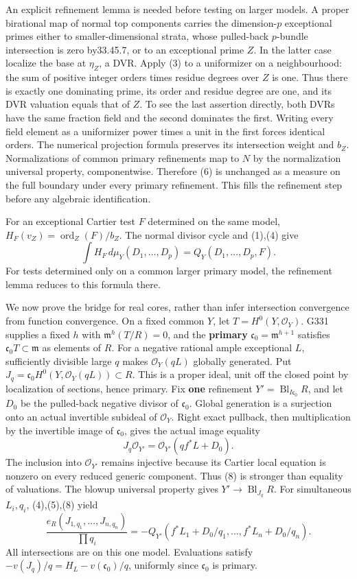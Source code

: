 \documentclass[
  11pt,
]{article}
\begin{document}
An explicit refinement lemma is needed before testing on larger models.
A proper birational map of normal top components carries the
dimension-\(p\) exceptional primes either to smaller-dimensional strata,
whose pulled-back \(p\)-bundle intersection is zero by33.45.7, or to an
exceptional prime \(Z\). In the latter case localize the base at
\(\eta_Z\), a DVR. Apply (3) to a uniformizer on a neighbourhood: the
sum of positive integer orders times residue degrees over \(Z\) is one.
Thus there is exactly one dominating prime, its order and residue degree
are one, and its DVR valuation equals that of \(Z\). To see the last
assertion directly, both DVRs have the same fraction field and the
second dominates the first. Writing every field element as a uniformizer
power times a unit in the first forces identical orders. The numerical
projection formula preserves its intersection weight and \(b_Z\).
Normalizations of common primary refinements map to \(N\) by the
normalization universal property, componentwise. Therefore (6) is
unchanged as a measure on the full boundary under every primary
refinement. This fills the refinement step before any algebraic
identification.

For an exceptional Cartier test \(F\) determined on the same model,
\(H_F(v_Z)=\operatorname{ord}_Z(F)/b_Z\). The normal divisor cycle and
(1),(4) give
\[\int H_F\,d\mu_Y(D_1,\ldots,D_p)=Q_Y(D_1,\ldots,D_p,F).\tag{7}\] For
tests determined only on a common larger primary model, the refinement
lemma reduces to this formula there.

We now prove the bridge for real cores, rather than infer intersection
convergence from function convergence. On a fixed common \(Y\), let
\(T=H^0(Y,\mathcal O_Y)\). G331 supplies a fixed \(h\) with
\(\mathfrak m^h(T/R)=0\), and the \textbf{primary}
\(\mathfrak c_0=\mathfrak m^{h+1}\) satisfies
\(\mathfrak c_0T\subset\mathfrak m\) as elements of \(R\). For a
negative rational ample exceptional \(L\), sufficiently divisible large
\(q\) makes \(\mathcal O_Y(qL)\) globally generated. Put
\(J_q=\mathfrak c_0H^0(Y,\mathcal O_Y(qL))\subset R\). This is a proper
ideal, unit off the closed point by localization of sections, hence
primary. Fix \textbf{one} refinement
\(Y'=\operatorname{Bl}_{I\mathfrak c_0}R\), and let \(D_0\) be the
pulled-back negative divisor of \(\mathfrak c_0\). Global generation is
a surjection onto an actual invertible subideal of \(\mathcal O_Y\).
Right exact pullback, then multiplication by the invertible image of
\(\mathfrak c_0\), gives the actual image equality
\[J_q\mathcal O_{Y'}=\mathcal O_{Y'}(qf^*L+D_0).\tag{8}\] The inclusion
into \(\mathcal O_{Y'}\) remains injective because its Cartier local
equation is nonzero on every reduced generic component. Thus (8) is
stronger than equality of valuations. The blowup universal property
gives \(Y'\to\operatorname{Bl}_{J_q}R\). For simultaneous \(L_i,q_i\),
(4),(5),(8) yield
\[\frac{e_R(J_{1,q_1},\ldots,J_{n,q_n})}{\prod q_i}=-Q_{Y'}(f^*L_1+D_0/q_1,\ldots,f^*L_n+D_0/q_n).\tag{9}\]
All intersections are on this one model. Evaluations satisfy
\(-v(J_q)/q=H_L-v(\mathfrak c_0)/q\), uniformly since \(\mathfrak c_0\)
is primary.
\end{document}

